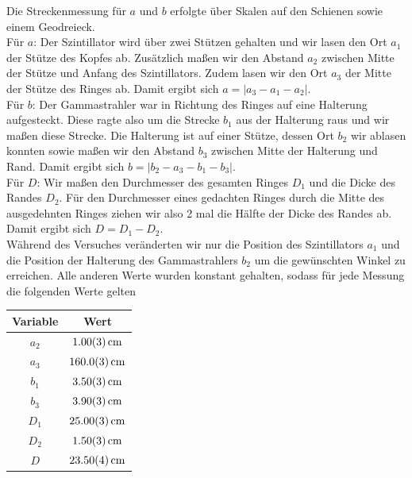 \noindent
Die Streckenmessung für $a$ und $b$ erfolgte über Skalen auf den Schienen sowie einem Geodreieck.\\
Für $a$: Der Szintillator wird über zwei Stützen gehalten und wir lasen den Ort $a_1$ der Stütze des Kopfes ab. Zusätzlich maßen wir den Abstand $a_2$ zwischen Mitte der Stütze und Anfang des Szintillators. Zudem lasen wir den Ort $a_3$ der Mitte der Stütze des Ringes ab. Damit ergibt sich $a = |a_3 - a_1 - a_2|$.\\
Für $b$: Der Gammastrahler war in Richtung des Ringes auf eine Halterung aufgesteckt. Diese ragte also um die Strecke $b_1$ aus der Halterung raus und wir maßen diese Strecke. Die Halterung ist auf einer Stütze, dessen Ort $b_2$ wir ablasen konnten sowie maßen wir den Abstand $b_3$ zwischen Mitte der Halterung und Rand. Damit ergibt sich $b = |b_2 - a_3 - b_1 - b_3|$.\\
Für $D$: Wir maßen den Durchmesser des gesamten Ringes $D_1$ und die Dicke des Randes $D_2$. Für den Durchmesser eines gedachten Ringes durch die Mitte des ausgedehnten Ringes ziehen wir also 2 mal die Hälfte der Dicke des Randes ab. Damit ergibt sich $D = D_1 - D_2$.\\
Während des Versuches veränderten wir nur die Position des Szintillators $a_1$ und die Position der Halterung des Gammastrahlers $b_2$ um die gewünschten Winkel zu erreichen. Alle anderen Werte wurden konstant gehalten, sodass für jede Messung die folgenden Werte gelten
\begin{center}
    \begin{tabular}{|c|c|}
        \hline
        \textbf{Variable} & \textbf{Wert}\\
        \hline
        $a_2$ & $\SI{1.0 \pm 0.03}{\centi\meter}$ \\
        \hline
        $a_3$ & $\SI{160.0 \pm 0.3}{\centi\meter}$ \\
        \hline
        $b_1$ & $\SI{3.5 \pm 0.03}{\centi\meter}$ \\
        \hline
        $b_3$ & $\SI{3.9 \pm 0.03}{\centi\meter}$ \\
        \hline
        $D_1$ & $\SI{25.0 \pm 0.03}{\centi\meter}$ \\
        \hline
        $D_2$ & $\SI{1.5 \pm 0.03}{\centi\meter}$ \\
        \hline
        $D$ & $\SI{23.5 \pm 0.04}{\centi\meter}$ \\
        \hline
    \end{tabular}
\end{center}
